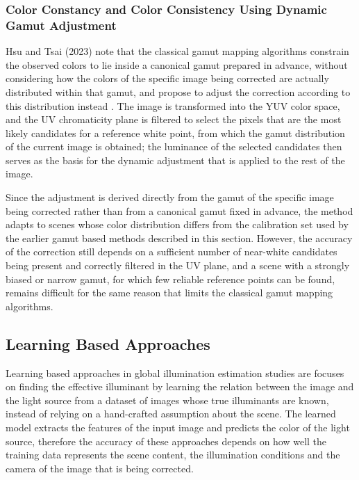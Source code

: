 \subsubsection{Color Constancy and Color Consistency Using Dynamic Gamut Adjustment}

Hsu and Tsai (2023) note that the classical gamut mapping algorithms constrain the observed colors to lie inside a canonical gamut prepared in advance, without considering how the colors of the specific image being corrected are actually distributed within that gamut, and propose to adjust the correction according to this distribution instead \cite{hsu2023color}. The image is transformed into the YUV color space, and the UV chromaticity plane is filtered to select the pixels that are the most likely candidates for a reference white point, from which the gamut distribution of the current image is obtained; the luminance of the selected candidates then serves as the basis for the dynamic adjustment that is applied to the rest of the image.

Since the adjustment is derived directly from the gamut of the specific image being corrected rather than from a canonical gamut fixed in advance, the method adapts to scenes whose color distribution differs from the calibration set used by the earlier gamut based methods described in this section. However, the accuracy of the correction still depends on a sufficient number of near-white candidates being present and correctly filtered in the UV plane, and a scene with a strongly biased or narrow gamut, for which few reliable reference points can be found, remains difficult for the same reason that limits the classical gamut mapping algorithms.

\subsection{Learning Based Approaches}
\label{sec:learning_based_approaches}
Learning based approaches in global illumination estimation studies are focuses on finding the effective illuminant by learning the relation between the image and the light source from a dataset of images whose true illuminants are known, instead of relying on a hand-crafted assumption about the scene. The learned model extracts the features of the input image and predicts the color of the light source, therefore the accuracy of these approaches depends on how well the training data represents the scene content, the illumination conditions and the camera of the image that is being corrected.

